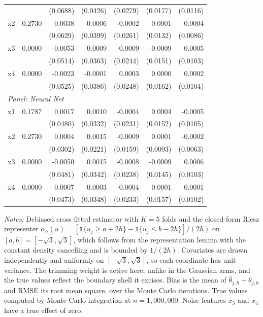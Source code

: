 \begin{table}[htbp]
\begin{threeparttable}
\begin{tabular}{lrrrrrr}
 &  & (0.0688) & (0.0426) & (0.0279) & (0.0177) & (0.0116) \\
\quad x2 & 0.2730 & 0.0038 & 0.0006 & -0.0002 & 0.0001 & 0.0004 \\
 &  & (0.0629) & (0.0399) & (0.0261) & (0.0132) & (0.0086) \\
\quad x3 & 0.0000 & -0.0053 & 0.0009 & -0.0009 & -0.0009 & 0.0005 \\
 &  & (0.0514) & (0.0363) & (0.0244) & (0.0151) & (0.0103) \\
\quad x4 & 0.0000 & -0.0023 & -0.0001 & 0.0003 & 0.0000 & 0.0002 \\
 &  & (0.0525) & (0.0386) & (0.0248) & (0.0162) & (0.0104) \\
\midrule
\multicolumn{7}{l}{\textit{Panel: Neural Net}} \\
\quad x1 & 0.1787 & 0.0017 & 0.0010 & -0.0004 & 0.0004 & -0.0005 \\
 &  & (0.0480) & (0.0332) & (0.0231) & (0.0152) & (0.0105) \\
\quad x2 & 0.2730 & 0.0004 & 0.0015 & -0.0009 & 0.0001 & -0.0002 \\
 &  & (0.0302) & (0.0221) & (0.0159) & (0.0093) & (0.0063) \\
\quad x3 & 0.0000 & -0.0050 & 0.0015 & -0.0008 & -0.0009 & 0.0006 \\
 &  & (0.0481) & (0.0342) & (0.0238) & (0.0145) & (0.0103) \\
\quad x4 & 0.0000 & 0.0007 & 0.0003 & -0.0004 & 0.0001 & 0.0001 \\
 &  & (0.0473) & (0.0348) & (0.0233) & (0.0157) & (0.0102) \\
\bottomrule
\end{tabular}
\begin{tablenotes}
\footnotesize
\item \textit{Notes:} Debiased cross-fitted estimator with $K=5$ folds and the closed-form Riesz representer $\alpha_h(u) = [\mathbb{1}\{u_j \geq a + 2h\} - \mathbb{1}\{u_j \leq b - 2h\}]/(2h)$ on $[a,b] = [-\sqrt{3},\sqrt{3}]$, which follows from the representation lemma with the constant density cancelling and is bounded by $1/(2h)$. Covariates are drawn independently and uniformly on $[-\sqrt{3},\sqrt{3}]$, so each coordinate has unit variance. The trimming weight is active here, unlike in the Gaussian arms, and the true values reflect the boundary shell it excises. Bias is the mean of $\hat{\theta}_{j,h} - \theta_{j,h}$ and RMSE its root mean square, over the Monte Carlo iterations. True values computed by Monte Carlo integration at $n=1{,}000{,}000$. Noise features $x_3$ and $x_4$ have a true effect of zero.
\end{tablenotes}
\end{threeparttable}
\end{table}